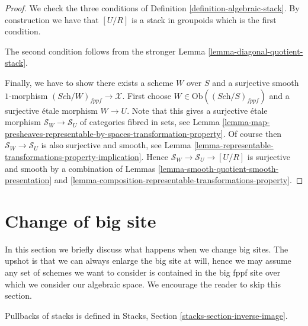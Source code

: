 \begin{proof}
We check the three conditions of
Definition \ref{definition-algebraic-stack}.
By construction we have that $[U/R]$ is a stack in groupoids
which is the first condition.

\medskip\noindent
The second condition follows from the stronger
Lemma \ref{lemma-diagonal-quotient-stack}.

\medskip\noindent
Finally, we have to show there exists a scheme $W$ over $S$
and a surjective smooth $1$-morphism
$(\textit{Sch}/W)_{fppf} \longrightarrow \mathcal{X}$.
First choose $W \in \text{Ob}((\textit{Sch}/S)_{fppf})$ and a
surjective \'etale morphism $W \to U$. Note that this
gives a surjective \'etale morphism $\mathcal{S}_W \to \mathcal{S}_U$
of categories fibred in sets, see
Lemma
\ref{lemma-map-presheaves-representable-by-spaces-transformation-property}.
Of course then $\mathcal{S}_W \to \mathcal{S}_U$ is also surjective and
smooth, see
Lemma \ref{lemma-representable-transformations-property-implication}.
Hence $\mathcal{S}_W \to \mathcal{S}_U \to [U/R]$ is surjective
and smooth by a combination of
Lemmas \ref{lemma-smooth-quotient-smooth-presentation} and
\ref{lemma-composition-representable-transformations-property}.
\end{proof}





\section{Change of big site}
\label{section-change-big-site}

\noindent
In this section we briefly discuss what happens when we change big sites.
The upshot is that we can always enlarge the big site at will, hence we
may assume any set of schemes we want to consider is contained in the big
fppf site over which we consider our algebraic space.
We encourage the reader to skip this section.

\medskip\noindent
Pullbacks of stacks is defined in
Stacks, Section \ref{stacks-section-inverse-image}.

